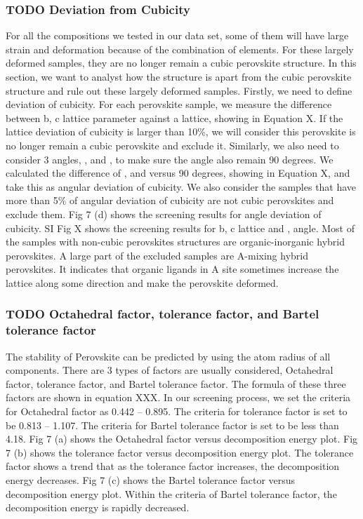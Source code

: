 \documentclass[twoside, twocolumn, 9pt, draft]{article}
\begin{document}
\subsubsection*{{\bfseries\sffamily TODO} Deviation from Cubicity}
\label{sec:org9618f97}
For all the compositions we tested in our data set, some of them will
have large strain and deformation because of the combination of
elements. For these largely deformed samples, they are no longer
remain a cubic perovskite structure. In this section, we want to
analyst how the structure is apart from the cubic perovskite structure
and rule out these largely deformed samples. Firstly, we need to
define deviation of cubicity. For each perovskite sample, we measure
the difference between b, c lattice parameter against a lattice,
showing in Equation X. If the lattice deviation of cubicity is larger
than 10\%, we will consider this perovskite is no longer remain a cubic
perovskite and exclude it.  Similarly, we also need to consider 3
angles, , and , to make sure the angle also remain 90 degrees. We
calculated the difference of , and versus 90 degrees, showing in
Equation X, and take this as angular deviation of cubicity. We also
consider the samples that have more than 5\% of angular deviation of
cubicity are not cubic perovskites and exclude them. Fig 7 (d) shows
the screening results for angle deviation of cubicity. SI Fig X shows
the screening results for b, c lattice and , angle. Most of the
samples with non-cubic perovskites structures are organic-inorganic
hybrid perovskites. A large part of the excluded samples are A-mixing
hybrid perovskites. It indicates that organic ligands in A site
sometimes increase the lattice along some direction and make the
perovskite deformed.

\subsubsection*{{\bfseries\sffamily TODO} Octahedral factor, tolerance factor, and Bartel tolerance factor}
\label{sec:org98772eb}
The stability of Perovskite can be predicted by using the atom radius
of all components. There are 3 types of factors are usually
considered, Octahedral factor, tolerance factor, and Bartel tolerance
factor. The formula of these three factors are shown in equation
XXX. In our screening process, we set the criteria for Octahedral
factor as 0.442 -- 0.895. The criteria for tolerance factor is set to
be 0.813 -- 1.107.  The criteria for Bartel tolerance factor is set to
be less than 4.18.  Fig 7 (a) shows the Octahedral factor versus
decomposition energy plot.  Fig 7 (b) shows the tolerance factor
versus decomposition energy plot.  The tolerance factor shows a trend
that as the tolerance factor increases, the decomposition energy
decreases. Fig 7 (c) shows the Bartel tolerance factor versus
decomposition energy plot. Within the criteria of Bartel tolerance
factor, the decomposition energy is rapidly decreased.
\end{document}
